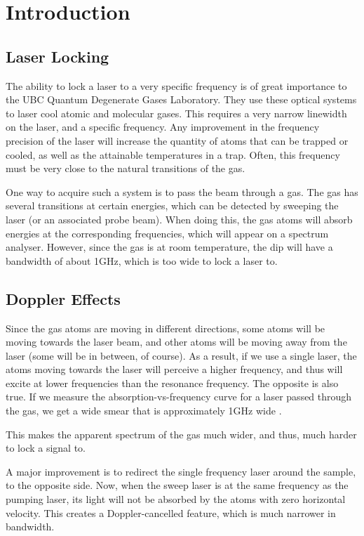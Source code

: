 \newpage
\section{Introduction}

\subsection{Laser Locking}

The ability to lock a laser to a very specific frequency is of great importance to the UBC Quantum Degenerate Gases Laboratory.  They use these optical systems to laser cool atomic and molecular gases.  This requires a very narrow linewidth on the laser, and a specific frequency.  Any improvement in the frequency precision of the laser will increase the quantity of atoms that can be trapped or cooled, as well as the attainable temperatures in a trap.  Often, this frequency must be very close to the natural transitions of the gas.

One way to acquire such a system is to pass the beam through a gas.  The gas has several transitions at certain energies, which can be detected by sweeping the laser (or an associated probe beam).  When doing this, the gas atoms will absorb energies at the corresponding frequencies, which will appear on a spectrum analyser.  However, since the gas is at room temperature, the dip will have a bandwidth of about 1GHz, which is too wide to lock a laser to.

\subsection{Doppler Effects}

Since the gas atoms are moving in different directions, some atoms will be moving towards the laser beam, and other atoms will be moving away from the laser (some will be in between, of course).  As a result, if we use a single laser, the atoms moving towards the laser will perceive a higher frequency, and thus will excite at lower frequencies than the resonance frequency.  The opposite is also true.  If we measure the absorption-vs-frequency curve for a laser passed through the gas, we get a wide smear that is approximately 1GHz wide \cite{madison14}.

This makes the apparent spectrum of the gas much wider, and thus, much harder to lock a signal to.

A major improvement is to redirect the single frequency laser around the sample, to the opposite side.  Now, when the sweep laser is at the same frequency as the pumping laser, its light will not be absorbed by the atoms with zero horizontal velocity.  This creates a Doppler-cancelled feature, which is much narrower in bandwidth.

